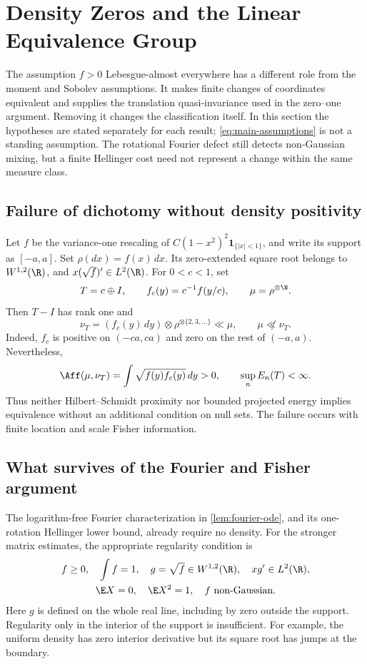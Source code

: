 \section{Density Zeros and the Linear Equivalence Group}
\label{sec:density-zeros-and-the-linear-equivalence-group}

The assumption \(f>0\) Lebesgue-almost everywhere has a different role
from the moment and Sobolev assumptions.
It makes finite changes of coordinates equivalent and supplies the
translation quasi-invariance used in the zero--one argument.
Removing it changes the classification itself.
In this section the hypotheses are stated separately for each result;
\eqref{eq:main-assumptions} is not a standing assumption.
The rotational Fourier defect still detects non-Gaussian mixing, but a finite
Hellinger cost need not represent a change within the same measure class.

\subsection{Failure of dichotomy without density positivity}
\label{sec:restricted-counterexample}

Let \(f\) be the variance-one rescaling of
\(C(1-x^2)^2\mathbf 1_{\{|x|<1\}}\), and write its support as
\([-a,a]\).
Set \(\rho(dx)=f(x)\,dx\).
Its zero-extended square root belongs to \(W^{1,2}(\R)\), and
\(x(\sqrt f)'\in L^2(\R)\).
For \(0<c<1\), set
\[
 T=c\oplus I,\qquad
 f_c(y)=c^{-1}f(y/c),\qquad \mu=\rho^{\otimes\N}.
\]
Then \(T-I\) has rank one and
\[
 \nu_T=(f_c(y)\,dy)\otimes\rho^{\otimes\{2,3,\ldots\}}\ll\mu,
 \qquad \mu\not\ll\nu_T.
\]
Indeed, \(f_c\) is positive on \((-ca,ca)\) and zero on the rest
of \((-a,a)\).
Nevertheless,
\[
 \Aff(\mu,\nu_T)=\int\sqrt{f(y)f_c(y)}\,dy>0,
 \qquad \sup_n E_n(T)<\infty.
\]
Thus neither Hilbert--Schmidt proximity nor bounded projected energy
implies equivalence without an additional condition on null sets.
The failure occurs with finite location and scale Fisher information.

\subsection{What survives of the Fourier and Fisher argument}
\label{sec:restricted-local}

The logarithm-free Fourier characterization in
\cref{lem:fourier-ode}, and its one-rotation Hellinger lower bound,
already require no density.
For the stronger matrix estimates, the appropriate regularity condition is
\begin{equation}
 \begin{gathered}
 f\geq0,\quad \int f=1,\quad
 g=\sqrt f\in W^{1,2}(\R),\quad xg'\in L^2(\R),\\
 \E X=0,\quad \E X^2=1,\quad f\text{ non-Gaussian}.
 \end{gathered}
 \label{eq:restricted-sobolev}
\end{equation}
Here \(g\) is defined on the whole real line, including by zero outside
the support.
Regularity only in the interior of the support is insufficient.
For example, the uniform density has zero interior derivative but its
square root has jumps at the boundary.

